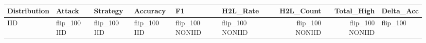 \begin{tabular}{llllllrrl}
\toprule
Distribution & Attack & Strategy & Accuracy & F1 & H2L_Rate & H2L_Count & Total_High & Delta_Acc \\
\midrule
IID & flip_100%
IID & flip_100%
IID & flip_100%
IID & flip_100%
NONIID & flip_100%
NONIID & flip_100%
NONIID & flip_100%
NONIID & flip_100%
\bottomrule
\end{tabular}
